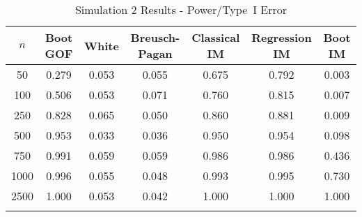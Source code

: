 \documentclass[sn-mathphys-ay]{sn-jnl}
\begin{document}

\begin{table}[h]
\caption{Simulation 2 Results - Power/Type~I Error}\label{sim2tab}%
\begin{tabular}{ c|c|c|c|c|c|c}
\toprule
$n$ & Boot GOF & White & Breusch-Pagan & Classical IM & Regression IM & Boot IM \\
\midrule
50 & 0.279 & 0.053 & 0.055 & 0.675 & 0.792 & 0.003 \\
100 & 0.506 & 0.053 & 0.071 & 0.760 & 0.815 & 0.007 \\
250 & 0.828 & 0.065 & 0.050 & 0.860 & 0.881 & 0.009 \\
500 & 0.953 & 0.033 & 0.036 & 0.950 & 0.954 & 0.098 \\
750 & 0.991 & 0.059 & 0.059 & 0.986 & 0.986 & 0.436 \\
1000 & 0.996 & 0.055 & 0.048 & 0.993 & 0.995 & 0.730 \\
2500 & 1.000 & 0.053 & 0.042 & 1.000 & 1.000 & 1.000 \\
\botrule
\end{tabular}

\end{table}
\end{document}
